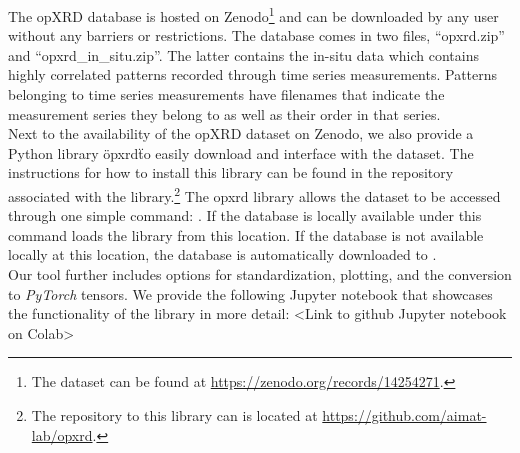 The opXRD database is hosted on Zenodo\footnote{The dataset can be found at \url{https://zenodo.org/records/14254271}.} and can be downloaded by any user without any barriers or restrictions. The database comes in two files, ``opxrd.zip'' and ``opxrd\_in\_situ.zip''. The latter contains the in-situ data which contains highly correlated patterns recorded through time series measurements. Patterns belonging to time series measurements have filenames that indicate the measurement series they belong to as well as their order in that series. \\

Next to the availability of the opXRD dataset on Zenodo, we also provide a Python library \"opxrd\" to easily download and interface with the dataset. The instructions for how to install this library can be found in the repository associated with the library.\footnote{The repository to this library can is located at \url{https://github.com/aimat-lab/opxrd}.} The opxrd library allows the dataset to be accessed through one simple command: . If the database is locally available under  this command loads the library from this location. If the database is not available locally at this location, the database is automatically downloaded to . \\

Our tool further includes options for standardization, plotting, and the conversion to \emph{PyTorch} tensors.
We provide the following Jupyter notebook that showcases the functionality of the library in more detail: <Link to github Jupyter notebook on Colab>

